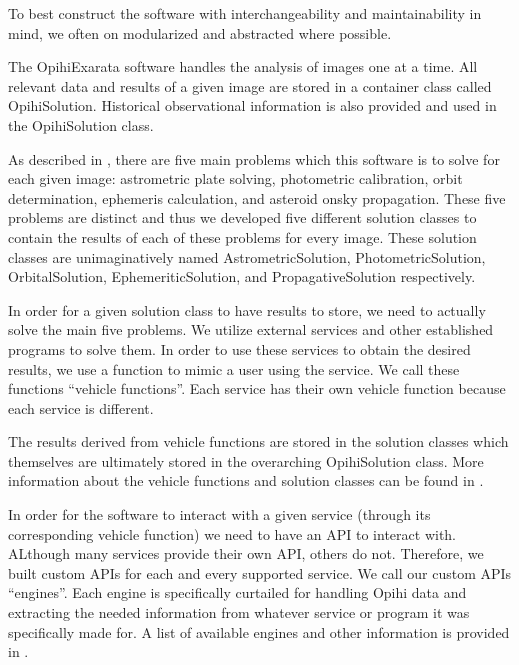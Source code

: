 \documentclass[letterpaper,11pt,english]{sphinxmanual}
\begin{document}
\sphinxAtStartPar
To best construct the software with interchangeability and maintainability in
mind, we often on modularized and abstracted where possible.

\sphinxAtStartPar
The OpihiExarata software handles the analysis of images one at a time.
All relevant data and results of a given image are stored in a container
class called OpihiSolution. Historical observational information is also
provided and used in the OpihiSolution class.

\sphinxAtStartPar
As described in {\hyperref[\detokenize{user/system_framework:user-system-framework}]{}}, there are five main problems
which this software is to solve for each given image: astrometric plate
solving, photometric calibration, orbit determination, ephemeris calculation,
and asteroid on\sphinxhyphen{}sky propagation. These five problems are distinct and thus we
developed five different solution classes to contain the results of each of
these problems for every image. These solution classes are unimaginatively
named AstrometricSolution, PhotometricSolution, OrbitalSolution,
EphemeriticSolution, and PropagativeSolution respectively.

\sphinxAtStartPar
In order for a given solution class to have results to store, we need to
actually solve the main five problems. We utilize external services and
other established programs to solve them. In order to use these services to
obtain the desired results, we use a function to mimic a user using the
service. We call these functions “vehicle functions”. Each service has their
own vehicle function because each service is different.

\sphinxAtStartPar
The results derived from vehicle functions are stored in the solution classes
which themselves are ultimately stored in the overarching OpihiSolution class.
More information about the vehicle functions and solution classes can be found
in {\hyperref[\detokenize{technical/architecture/vehicles_solutions:technical-architecture-vehicles-solutions}]{}}.

\sphinxAtStartPar
In order for the software to interact with a given service (through its
corresponding vehicle function) we need to have an API to interact with.
ALthough many services provide their own API, others do not. Therefore, we
built custom APIs for each and every supported service. We call our custom
APIs “engines”. Each engine is specifically curtailed for handling Opihi
data and extracting the needed information from whatever service or program it
was specifically made for. A list of available engines and other information
is provided in {\hyperref[\detokenize{technical/architecture/services_engines:technical-architecture-services-engines}]{}}.
\end{document}
